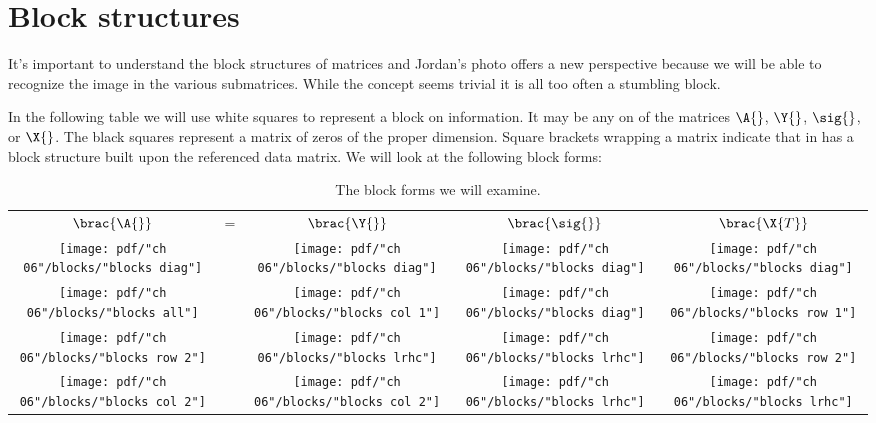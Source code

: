 \clearpage
\break

\section{Block structures}
It's important to understand the block structures of matrices and Jordan's photo offers a new perspective because we will be able to recognize the image in the various submatrices. While the concept seems trivial it is all too often a stumbling block. 

In the following table we will use white squares to represent a block on information. It may be any on of the matrices $\A{}$, $\Y{}$, $\sig{}$, or $\X{}$. The black squares represent a matrix of zeros of the proper dimension. Square brackets wrapping a matrix indicate that in has a block structure built upon the referenced data matrix. We will look at the following block forms:
\begin{table}[htdp]
\begin{center}
\begin{tabular}{ccccc}
  $\brac{\A{}}$ &=& $\brac{\Y{}}$ & $\brac{\sig{}}$ & $\brac{\X{T}}$\\
  \texttt{[image: pdf/"ch 06"/blocks/"blocks diag"]} &&
  \texttt{[image: pdf/"ch 06"/blocks/"blocks diag"]} &
  \texttt{[image: pdf/"ch 06"/blocks/"blocks diag"]} &
  \texttt{[image: pdf/"ch 06"/blocks/"blocks diag"]} \\
  \texttt{[image: pdf/"ch 06"/blocks/"blocks all"]} &&
  \texttt{[image: pdf/"ch 06"/blocks/"blocks col 1"]} &
  \texttt{[image: pdf/"ch 06"/blocks/"blocks diag"]} &
  \texttt{[image: pdf/"ch 06"/blocks/"blocks row 1"]} \\
  \texttt{[image: pdf/"ch 06"/blocks/"blocks row 2"]} &&
  \texttt{[image: pdf/"ch 06"/blocks/"blocks lrhc"]} &
  \texttt{[image: pdf/"ch 06"/blocks/"blocks lrhc"]} &
  \texttt{[image: pdf/"ch 06"/blocks/"blocks row 2"]} \\
  \texttt{[image: pdf/"ch 06"/blocks/"blocks col 2"]} &&
  \texttt{[image: pdf/"ch 06"/blocks/"blocks col 2"]} &
  \texttt{[image: pdf/"ch 06"/blocks/"blocks lrhc"]} &
  \texttt{[image: pdf/"ch 06"/blocks/"blocks lrhc"]} \\
\end{tabular}
\end{center}
\label{tab:jordan:blocks:basic}
\caption[The block forms we will examine]{The block forms we will examine.}
\end{table}%


